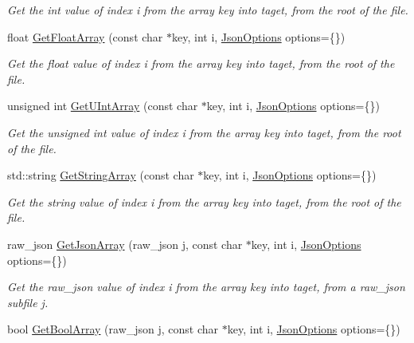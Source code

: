 \begin{DoxyCompactItemize}
\begin{DoxyCompactList}\small\item\em Get the int value of index {\itshape i} from the array {\itshape key} into {\itshape taget}, from the root of the file. \end{DoxyCompactList}\item 
float \hyperlink{classTarbora_1_1Json_ad7793296ed4dc11c6cb53a36c8b998d8}{Get\+Float\+Array} (const char $\ast$key, int i, \hyperlink{structTarbora_1_1JsonOptions}{Json\+Options} options=\{\})
\begin{DoxyCompactList}\small\item\em Get the float value of index {\itshape i} from the array {\itshape key} into {\itshape taget}, from the root of the file. \end{DoxyCompactList}\item 
unsigned int \hyperlink{classTarbora_1_1Json_a1b059c47cbcffaa97e7ce129a05f7682}{Get\+U\+Int\+Array} (const char $\ast$key, int i, \hyperlink{structTarbora_1_1JsonOptions}{Json\+Options} options=\{\})
\begin{DoxyCompactList}\small\item\em Get the unsigned int value of index {\itshape i} from the array {\itshape key} into {\itshape taget}, from the root of the file. \end{DoxyCompactList}\item 
std\+::string \hyperlink{classTarbora_1_1Json_a14da3578c062f1291d1957146569dabf}{Get\+String\+Array} (const char $\ast$key, int i, \hyperlink{structTarbora_1_1JsonOptions}{Json\+Options} options=\{\})
\begin{DoxyCompactList}\small\item\em Get the string value of index {\itshape i} from the array {\itshape key} into {\itshape taget}, from the root of the file. \end{DoxyCompactList}\item 
raw\+\_\+json \hyperlink{classTarbora_1_1Json_ad96e1e105a7a043803895f8b0a7fa637}{Get\+Json\+Array} (raw\+\_\+json j, const char $\ast$key, int i, \hyperlink{structTarbora_1_1JsonOptions}{Json\+Options} options=\{\})
\begin{DoxyCompactList}\small\item\em Get the raw\+\_\+json value of index {\itshape i} from the array {\itshape key} into {\itshape taget}, from a raw\+\_\+json subfile {\itshape j}. \end{DoxyCompactList}\item 
bool \hyperlink{classTarbora_1_1Json_a79c56d65e975c8f0209a022e81a3ea77}{Get\+Bool\+Array} (raw\+\_\+json j, const char $\ast$key, int i, \hyperlink{structTarbora_1_1JsonOptions}{Json\+Options} options=\{\})

\end{DoxyCompactItemize}
